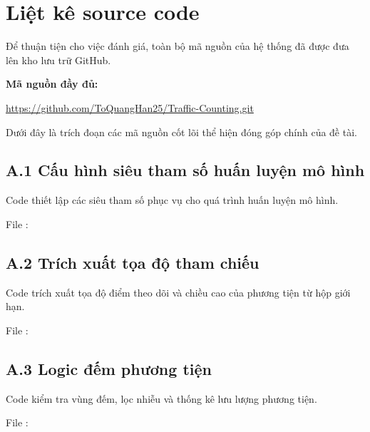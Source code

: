 
\chapter{Liệt kê source code} %

\label{AppendixA} %

Để thuận tiện cho việc đánh giá, toàn bộ mã nguồn của hệ thống đã được đưa lên kho lưu trữ GitHub.

\textbf{Mã nguồn đầy đủ:}
	
\url{https://github.com/ToQuangHan25/Traffic-Counting.git}

Dưới đây là trích đoạn các mã nguồn cốt lõi thể hiện đóng góp chính của đề tài.

\section{A.1 Cấu hình siêu tham số huấn luyện mô hình}

Code thiết lập các siêu tham số phục vụ cho quá trình huấn luyện mô hình.

File :


\section{A.2 Trích xuất tọa độ tham chiếu}

Code trích xuất tọa độ điểm theo dõi và chiều cao của phương tiện từ hộp giới hạn.

File :


\section{A.3 Logic đếm phương tiện}

Code kiểm tra vùng đếm, lọc nhiễu và thống kê lưu lượng phương tiện.

File :
